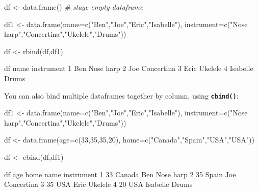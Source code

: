 \documentclass[
]{book}
\newenvironment{Shaded}{\begin{snugshade}}{\end{snugshade}}
\newcommand{\AttributeTok}[1]{\textcolor[rgb]{0.77,0.63,0.00}{#1}}
\newcommand{\CommentTok}[1]{\textcolor[rgb]{0.56,0.35,0.01}{\textit{#1}}}
\newcommand{\DecValTok}[1]{\textcolor[rgb]{0.00,0.00,0.81}{#1}}
\newcommand{\FunctionTok}[1]{\textcolor[rgb]{0.00,0.00,0.00}{#1}}
\newcommand{\NormalTok}[1]{#1}
\newcommand{\OtherTok}[1]{\textcolor[rgb]{0.56,0.35,0.01}{#1}}
\newcommand{\StringTok}[1]{\textcolor[rgb]{0.31,0.60,0.02}{#1}}
\begin{document}
\begin{Shaded}
\begin{Highlighting}[]
\NormalTok{df }\OtherTok{\textless{}{-}} \FunctionTok{data.frame}\NormalTok{() }\CommentTok{\# stage empty dataframe}

\NormalTok{df1 }\OtherTok{\textless{}{-}} \FunctionTok{data.frame}\NormalTok{(}\AttributeTok{name=}\FunctionTok{c}\NormalTok{(}\StringTok{"Ben"}\NormalTok{,}\StringTok{"Joe"}\NormalTok{,}\StringTok{"Eric"}\NormalTok{,}\StringTok{"Isabelle"}\NormalTok{),}
                  \AttributeTok{instrument=}\FunctionTok{c}\NormalTok{(}\StringTok{"Nose harp"}\NormalTok{,}\StringTok{"Concertina"}\NormalTok{,}\StringTok{"Ukelele"}\NormalTok{,}\StringTok{"Drums"}\NormalTok{))}

\NormalTok{df }\OtherTok{\textless{}{-}} \FunctionTok{rbind}\NormalTok{(df,df1)}

\NormalTok{df}
\NormalTok{      name instrument}
\DecValTok{1}\NormalTok{      Ben  Nose harp}
\DecValTok{2}\NormalTok{      Joe Concertina}
\DecValTok{3}\NormalTok{     Eric    Ukelele}
\DecValTok{4}\NormalTok{ Isabelle      Drums}
\end{Highlighting}
\end{Shaded}

You can also bind multiple dataframes together by column, using \textbf{\texttt{cbind()}}:

\begin{Shaded}
\begin{Highlighting}[]
\NormalTok{df1 }\OtherTok{\textless{}{-}} \FunctionTok{data.frame}\NormalTok{(}\AttributeTok{name=}\FunctionTok{c}\NormalTok{(}\StringTok{"Ben"}\NormalTok{,}\StringTok{"Joe"}\NormalTok{,}\StringTok{"Eric"}\NormalTok{,}\StringTok{"Isabelle"}\NormalTok{),}
                  \AttributeTok{instrument=}\FunctionTok{c}\NormalTok{(}\StringTok{"Nose harp"}\NormalTok{,}\StringTok{"Concertina"}\NormalTok{,}\StringTok{"Ukelele"}\NormalTok{,}\StringTok{"Drums"}\NormalTok{))}

\NormalTok{df }\OtherTok{\textless{}{-}} \FunctionTok{data.frame}\NormalTok{(}\AttributeTok{age=}\FunctionTok{c}\NormalTok{(}\DecValTok{33}\NormalTok{,}\DecValTok{35}\NormalTok{,}\DecValTok{35}\NormalTok{,}\DecValTok{20}\NormalTok{), }\AttributeTok{home=}\FunctionTok{c}\NormalTok{(}\StringTok{"Canada"}\NormalTok{,}\StringTok{"Spain"}\NormalTok{,}\StringTok{"USA"}\NormalTok{,}\StringTok{"USA"}\NormalTok{))}

\NormalTok{df }\OtherTok{\textless{}{-}} \FunctionTok{cbind}\NormalTok{(df,df1)}

\NormalTok{df}
\NormalTok{  age   home     name instrument}
\DecValTok{1}  \DecValTok{33}\NormalTok{ Canada      Ben  Nose harp}
\DecValTok{2}  \DecValTok{35}\NormalTok{  Spain      Joe Concertina}
\DecValTok{3}  \DecValTok{35}\NormalTok{    USA     Eric    Ukelele}
\DecValTok{4}  \DecValTok{20}\NormalTok{    USA Isabelle      Drums}
\end{Highlighting}
\end{Shaded}
\end{document}
